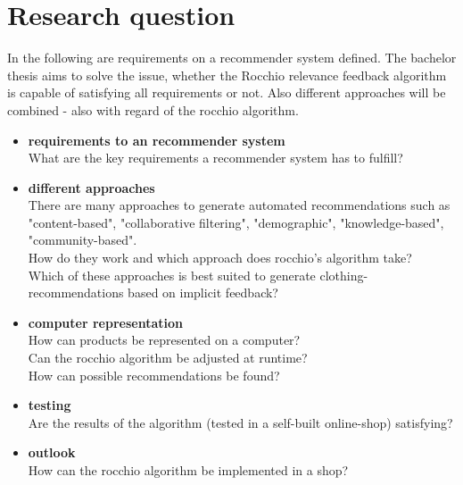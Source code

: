 

\section{Research question}
In the following are requirements on a recommender system defined.
The bachelor thesis aims to solve the issue, whether the Rocchio relevance feedback algorithm is capable of satisfying all requirements or not.
Also different approaches will be combined - also with regard of the rocchio algorithm.


\begin{itemize}
    \item \textbf{requirements to an recommender system}\\
        What are the key requirements a recommender system has to fulfill?

    \item \textbf{different approaches}\\
        There are many approaches to generate automated recommendations such as "content-based", "collaborative filtering", "demographic", "knowledge-based", "community-based".\citep[p.~10-12]{ricci:11}\\
        How do they work and which approach does rocchio's algorithm take?\\
        Which of these approaches is best suited to generate clothing-recommendations based on implicit feedback?

    \item \textbf{computer representation}\\
        How can products be represented on a computer?\\
        Can the rocchio algorithm be adjusted at runtime?\\
        How can possible recommendations be found?

    \item \textbf{testing}\\
        Are the results of the algorithm (tested in a self-built online-shop) satisfying?

    \item \textbf{outlook}\\
        How can the rocchio algorithm be implemented in a shop?
        
\end{itemize}










